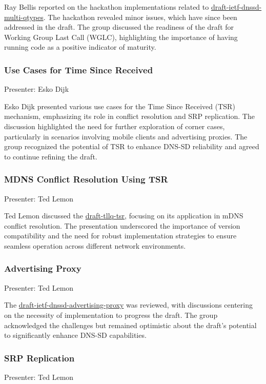 \documentclass{article}
\begin{document}
Ray Bellis reported on the hackathon implementations related to \href{https://datatracker.ietf.org/doc/html/draft-ietf-dnssd-multi-qtypes}{draft-ietf-dnssd-multi-qtypes}. The hackathon revealed minor issues, which have since been addressed in the draft. The group discussed the readiness of the draft for Working Group Last Call (WGLC), highlighting the importance of having running code as a positive indicator of maturity.

\subsubsection{Use Cases for Time Since Received}
Presenter: Esko Dijk

Esko Dijk presented various use cases for the Time Since Received (TSR) mechanism, emphasizing its role in conflict resolution and SRP replication. The discussion highlighted the need for further exploration of corner cases, particularly in scenarios involving mobile clients and advertising proxies. The group recognized the potential of TSR to enhance DNS-SD reliability and agreed to continue refining the draft.

\subsubsection{MDNS Conflict Resolution Using TSR}
Presenter: Ted Lemon

Ted Lemon discussed the \href{https://datatracker.ietf.org/doc/html/draft-tllq-tsr}{draft-tllq-tsr}, focusing on its application in mDNS conflict resolution. The presentation underscored the importance of version compatibility and the need for robust implementation strategies to ensure seamless operation across different network environments.

\subsubsection{Advertising Proxy}
Presenter: Ted Lemon

The \href{https://datatracker.ietf.org/doc/html/draft-ietf-dnssd-advertising-proxy}{draft-ietf-dnssd-advertising-proxy} was reviewed, with discussions centering on the necessity of implementation to progress the draft. The group acknowledged the challenges but remained optimistic about the draft's potential to significantly enhance DNS-SD capabilities.

\subsubsection{SRP Replication}
Presenter: Ted Lemon
\end{document}
